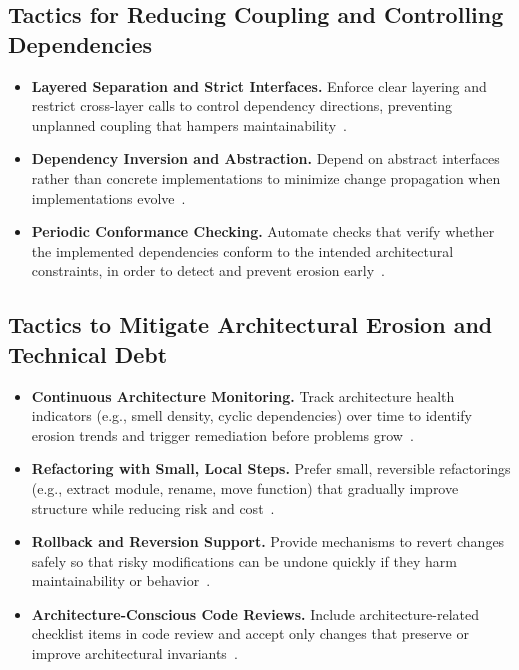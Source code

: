 \subsection{Tactics for Reducing Coupling and Controlling Dependencies}
\begin{itemize}
    \item \textbf{Layered Separation and Strict Interfaces.} Enforce clear layering and restrict cross-layer calls to control dependency directions, preventing unplanned coupling that hampers maintainability~\cite{garlan1993introduction}.
    \item \textbf{Dependency Inversion and Abstraction.} Depend on abstract interfaces rather than concrete implementations to minimize change propagation when implementations evolve~\cite{kim2009qualitydriven}.
    \item \textbf{Periodic Conformance Checking.} Automate checks that verify whether the implemented dependencies conform to the intended architectural constraints, in order to detect and prevent erosion early~\cite{li2021understanding}.
\end{itemize}

\subsection{Tactics to Mitigate Architectural Erosion and Technical Debt}
\begin{itemize}
    \item \textbf{Continuous Architecture Monitoring.} Track architecture health indicators (e.g., smell density, cyclic dependencies) over time to identify erosion trends and trigger remediation before problems grow~\cite{li2021understanding}.
    \item \textbf{Refactoring with Small, Local Steps.} Prefer small, reversible refactorings (e.g., extract module, rename, move function) that gradually improve structure while reducing risk and cost~\cite{molnar2020study}.
    \item \textbf{Rollback and Reversion Support.} Provide mechanisms to revert changes safely so that risky modifications can be undone quickly if they harm maintainability or behavior~\cite{li2021understanding}.
    \item \textbf{Architecture-Conscious Code Reviews.} Include architecture-related checklist items in code review and accept only changes that preserve or improve architectural invariants~\cite{rosik2011assessing}.
\end{itemize}

